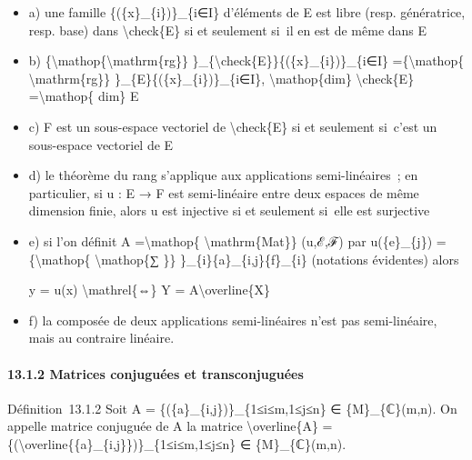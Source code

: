 \documentclass[]{article}
\begin{document}
\begin{itemize}
\item
  a) une famille \{(\{x\}\_\{i\})\}\_\{i∈I\} d'éléments de E est libre
  (resp. génératrice, resp. base) dans \textbackslash{}check\{E\} si et
  seulement si~il en est de même dans E
\item
  b) \{\textbackslash{}mathop\{\textbackslash{}mathrm\{rg\}\}
  \}\_\{\textbackslash{}check\{E\}\}\{(\{x\}\_\{i\})\}\_\{i∈I\}
  =\{\textbackslash{}mathop\{ \textbackslash{}mathrm\{rg\}\}
  \}\_\{E\}\{(\{x\}\_\{i\})\}\_\{i∈I\}, \textbackslash{}mathop\{dim\}
  \textbackslash{}check\{E\} =\textbackslash{}mathop\{ dim\} E
\item
  c) F est un sous-espace vectoriel de \textbackslash{}check\{E\} si et
  seulement si~c'est un sous-espace vectoriel de E
\item
  d) le théorème du rang s'applique aux applications semi-linéaires~; en
  particulier, si u : E → F est semi-linéaire entre deux espaces de même
  dimension finie, alors u est injective si et seulement si~elle est
  surjective
\item
  e) si l'on définit A =\textbackslash{}mathop\{
  \textbackslash{}mathrm\{Mat\}\} (u,ℰ,ℱ) par u(\{e\}\_\{j\})
  =\{\textbackslash{}mathop\{ \textbackslash{}mathop\{∑ \}\}
  \}\_\{i\}\{a\}\_\{i,j\}\{f\}\_\{i\} (notations évidentes) alors

  y = u(x) \textbackslash{}mathrel\{⇔\} Y =
  A\textbackslash{}overline\{X\}
\item
  f) la composée de deux applications semi-linéaires n'est pas
  semi-linéaire, mais au contraire linéaire.
\end{itemize}

\paragraph{13.1.2 Matrices conjuguées et transconjuguées}

Définition~13.1.2 Soit A = \{(\{a\}\_\{i,j\})\}\_\{1≤i≤m,1≤j≤n\} ∈
\{M\}\_\{ℂ\}(m,n). On appelle matrice conjuguée de A la matrice
\textbackslash{}overline\{A\} =
\{(\textbackslash{}overline\{\{a\}\_\{i,j\}\})\}\_\{1≤i≤m,1≤j≤n\} ∈
\{M\}\_\{ℂ\}(m,n).
\end{document}
